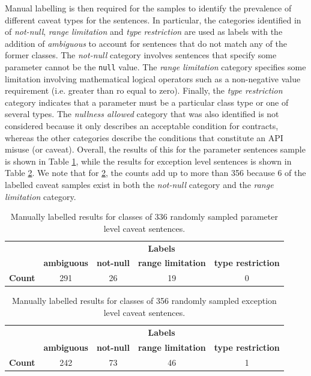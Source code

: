 Manual labelling is then required for the samples to identify the prevalence of different caveat types for the sentences. In  particular, the categories identified in \cite{zhou-directive} of \textit{not-null}, \textit{range limitation} and \textit{type restriction} are used as labels with the addition of \textit{ambiguous} to account for sentences that do not match any of the former classes. The \textit{not-null} category involves sentences that specify some parameter cannot be the \lstinline{null} value. The \textit{range limitation} category specifies some limitation involving mathematical logical operators such as a non-negative value requirement (i.e. greater than ro equal to zero). Finally, the \textit{type restriction} category indicates that a parameter must be a particular class type or one of several types. The \textit{nullness allowed} category that was also identified is not considered because it only describes an acceptable condition for contracts, whereas the other categories describe the conditions that constitute an API misuse (or caveat). Overall, the results of this for the parameter sentences sample is shown in Table \ref{tab:caveat-param-stats}, while the results for exception level sentences is shown in Table \ref{tab:caveat-exception-stats}. We note that for \ref{tab:caveat-exception-stats}, the counts add up to more than 356 because 6 of the labelled caveat samples exist in both the \textit{not-null} category and the \textit{range limitation} category. 

\begin{table}[h]
	\centering
	\begin{tabular}{|l|cccc|}
		\hline
		& \multicolumn{4}{c|}{\textbf{Labels}} \\ \cline{2-5} 
		& \textbf{ambiguous} & \textbf{not-null} & \textbf{range limitation} & \textbf{type restriction} \\ \hline
		\textbf{Count} & 291 & 26 & 19 & 0 \\ \hline
	\end{tabular}
	\caption{Manually labelled results for classes of 336 randomly sampled parameter level caveat sentences.}
	\label{tab:caveat-param-stats}
\end{table}

\begin{table}[h]
	\centering
	\begin{tabular}{|l|cccc|}
		\hline
		& \multicolumn{4}{c|}{\textbf{Labels}} \\ \cline{2-5} 
		& \textbf{ambiguous} & \textbf{not-null} & \textbf{range limitation} & \textbf{type restriction} \\ \hline
		\textbf{Count} & 242 & 73 & 46 & 1 \\ \hline
	\end{tabular}
	\caption{Manually labelled results for classes of 356 randomly sampled exception level caveat sentences.}
	\label{tab:caveat-exception-stats}
\end{table}

